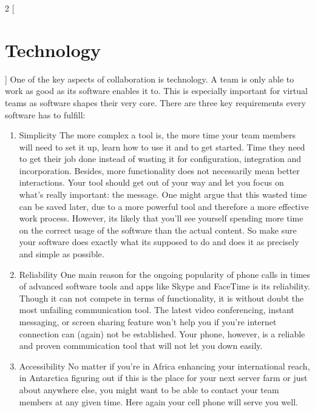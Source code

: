 \begin{multicols}{2}
[\section{Technology}]
One of the key aspects of collaboration is technology. A team is only able to work as good as its software enables it to. This is especially important for virtual teams as software shapes their very core.
There are three key requirements every software has to fulfill:

\begin{enumerate}[1.]

	\item Simplicity
The more complex a tool is, the more time your team members will need to set it up, learn how to use it and to get started. Time they need to get their job done instead of wasting it  for configuration, integration and incorporation. Besides, more functionality does not necessarily mean better interactions. Your tool should get out of your way and let you focus on what’s really important: the message. One might argue that this wasted time can be saved later, due to a more powerful tool and therefore a more effective work process. However, its likely that you’ll see yourself spending more time on the correct usage of the software than the actual content. So make sure your software does exactly what its supposed to do and does it as precisely and simple as possible.

	\item Reliability
One main reason for the ongoing popularity of phone calls in times of advanced software tools and apps like Skype and FaceTime is its reliability. Though it can not compete in terms of functionality, it is without doubt the most unfailing communication tool. The latest video conferencing, instant messaging, or screen sharing feature won’t help you if you’re internet connection can (again) not be established.
Your phone, however, is a reliable and proven communication tool that will not let you down easily.

	\item Accessibility
No matter if you’re in Africa enhancing your international reach, in Antarctica figuring out if this is the place for your next server farm or just about anywhere else, you might want to be able to contact your team members at any given time.  Here again your cell phone will serve you well.
\end{enumerate}
\end{multicols}